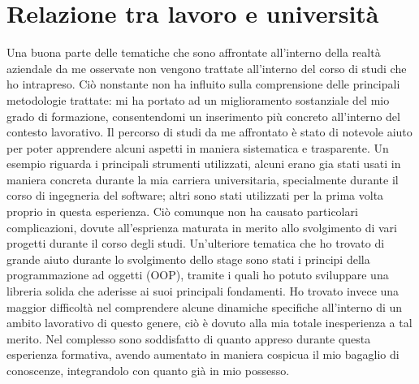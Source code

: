 \section{Relazione tra lavoro e università}
Una buona parte delle tematiche che sono affrontate all'interno della realtà aziendale da me osservate non vengono trattate all'interno del corso di studi che ho intrapreso. Ciò nonstante non ha influito sulla comprensione delle principali metodologie trattate: mi ha portato ad un miglioramento sostanziale del mio grado di formazione, consentendomi un inserimento più concreto all'interno del contesto lavorativo.
Il percorso di studi da me affrontato è stato di notevole aiuto per poter apprendere alcuni aspetti in maniera sistematica e trasparente. Un esempio riguarda i principali strumenti utilizzati, alcuni erano gia stati usati in maniera concreta durante la mia carriera universitaria, specialmente durante il corso di ingegneria del software; altri sono stati utilizzati per la prima volta proprio in questa esperienza. Ciò comunque non ha causato particolari complicazioni, dovute all'esprienza maturata in merito allo svolgimento di vari progetti durante il corso degli studi. Un'ulteriore tematica che ho trovato di grande aiuto durante lo svolgimento dello stage sono stati i principi della programmazione ad oggetti (\gls{OOP}), tramite i quali ho potuto sviluppare una libreria solida che aderisse ai suoi principali fondamenti. Ho trovato invece una maggior difficoltà nel comprendere alcune dinamiche specifiche all'interno di un ambito lavorativo di questo genere, ciò è dovuto alla mia totale inesperienza a tal merito. Nel complesso sono soddisfatto di quanto appreso durante questa esperienza formativa, avendo aumentato in maniera cospicua il mio bagaglio di conoscenze, integrandolo con quanto già in mio possesso. 
